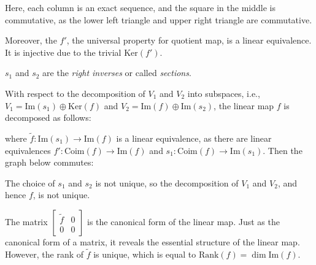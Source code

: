 \documentclass[
	11pt, %
	fleqn, %
	a4paper, %
]{LegrandOrangeBook}
\renewcommand{\ker}[1]{\text{Ker}(#1)} %
\renewcommand{\Im}[1]{\text{Im}(#1)} %
\newcommand{\rank}[1]{\text{Rank}(#1)} %
\newcommand{\coim}[1]{\text{Coim}(#1)} %
\begin{document}
Here, each column is an exact sequence, and the square in the middle is commutative, as the lower left triangle and upper right triangle are commutative.

Moreover, the $f'$, the universal property for quotient map, is a linear equivalence. It is injective due to the trivial $\ker{f'}$. 

$s_1$ and $s_2$ are the \emph{right inverses} or called \emph{sections}.

With respect to the decomposition of $V_1$ and $V_2$ into subspaces, i.e., $V_1 = \Im{s_1} \oplus \ker{f}$ and $V_2 = \Im{f} \oplus \Im{s_2}$, the linear map $f$ is decomposed as follows:
\begin{center}
\end{center}
where $\tilde{f} : \Im{s_1} \to \Im{f}$ is a linear equivalence, as there are linear equivalences $f' : \coim{f} \to \Im{f}$ and $s_1 : \coim{f} \to \Im{s_1}$. Then the graph below commutes:

\begin{center}
\end{center}

\begin{remark}
    The choice of $s_1$ and $s_2$ is not unique, so the decomposition of $V_1$ and $V_2$, and hence $f$, is not unique.
\end{remark}

The matrix $\begin{bmatrix}
    \tilde{f} & 0 \\
    0 & 0
\end{bmatrix}$ is the canonical form of the linear map. Just as the canonical form of a matrix, it reveals the essential structure of the linear map. However, the rank of $\tilde{f}$ is unique, which is equal to $\rank{f} = \dim{\Im{f}}$.
\end{document}
